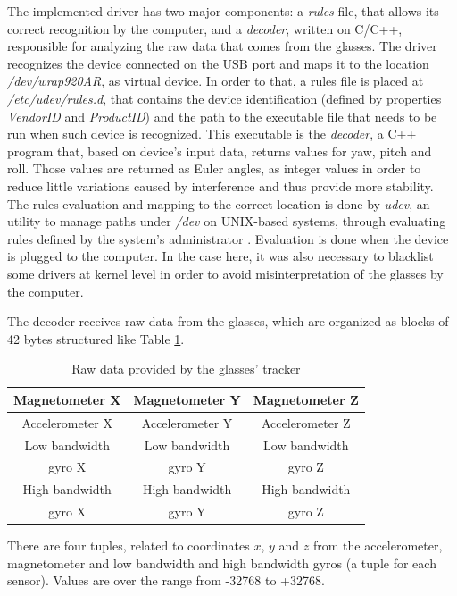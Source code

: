 \documentclass[msc, a4paper, classic, en]{ufbathesis}
\begin{document}
The implemented driver has two major components: a \textit{rules} file, that allows its correct recognition by the computer, and a \textit{decoder}, written on C/C++, responsible for analyzing the raw data that comes from the glasses. The driver recognizes the device connected on the USB port and maps it to the location \textit{/dev/wrap920AR}, as virtual device. In order to that, a rules file is placed at \textit{/etc/udev/rules.d}, that contains the device identification (defined by properties \textit{VendorID} and \textit{ProductID}) and the path to the executable file that needs to be run when such device is recognized. This executable is the \textit{decoder}, a C++ program that, based on device's input data, returns values for yaw, pitch and roll. Those values are returned as Euler angles, as integer values in order to reduce little variations caused by interference and thus provide more stability. The rules evaluation and mapping to the correct location is done by \textit{udev}, an utility to manage paths under \textit{/dev} on UNIX-based systems, through evaluating rules defined by the system's administrator \cite{udev}. Evaluation is done when the device is plugged to the computer. In the case here, it was also necessary to blacklist some drivers at kernel level in order to avoid misinterpretation of the glasses by the computer.

The decoder receives raw data from the glasses, which are organized as blocks of 42 bytes structured like Table \ref{tab:glassesdata}.

\begin{table}
\caption{Raw data provided by the glasses' tracker}
\label{tab:glassesdata}
\centering
\begin{tabular}{|c|c|c|}
\hline
Magnetometer X                & Magnetometer Y                & Magnetometer Z\\
\hline
Accelerometer X                & Accelerometer Y                & Accelerometer Z\\
\hline
Low bandwidth & Low bandwidth & Low bandwidth \\
gyro X & gyro Y & gyro Z \\
\hline
High bandwidth & High bandwidth & High bandwidth \\
gyro X & gyro Y & gyro Z \\
\hline
\end{tabular}
\end{table}

There are four tuples, related to coordinates $x$, $y$ and $z$ from the accelerometer, magnetometer and low bandwidth and high bandwidth gyros (a tuple for each sensor). Values are over the range from -32768 to +32768.
\end{document}
